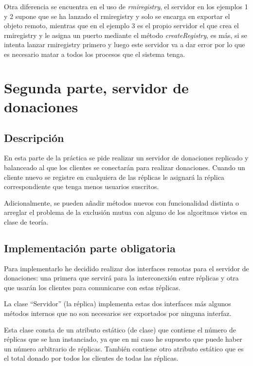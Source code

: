 \documentclass{article}
\begin{document}
Otra diferencia se encuentra en el uso de \textit{rmiregistry}, el servidor en los ejemplos 1 y 2 supone que se ha lanzado el rmiregistry y solo se encarga en exportar el objeto remoto, mientras que en el ejemplo 3 es el propio servidor el que crea el rmiregistry y le asigna un puerto mediante el método \textit{createRegistry}, es más, si se intenta lanzar rmiregistry primero y luego este servidor va a dar error por lo que es necesario matar a todos los procesos que el sistema tenga.


\section{Segunda parte, servidor de donaciones}
\subsection{Descripción}
En esta parte de la práctica se pide realizar un servidor de donaciones replicado y balanceado al que los clientes se conectarán para realizar donaciones. Cuando un cliente nuevo se registre en cualquiera de las réplicas le asignará la réplica correspondiente que tenga menos usuarios suscritos.

Adicionalmente, se pueden añadir métodos nuevos con funcionalidad distinta o arreglar el problema de la exclusión mutua con alguno de los algoritmos vistos en clase de teoría.

\subsection{Implementación parte obligatoria}
Para implementarlo he decidido realizar dos interfaces remotas para el servidor de donaciones: una primera que servirá para la interconexión entre réplicas y otra que usarán los clientes para comunicarse con estas réplicas.


La clase ``Servidor'' (la réplica) implementa estas dos interfaces más algunos métodos internos que no son necesarios ser exportados por ninguna interfaz.

Esta clase consta de un atributo estático (de clase) que contiene el número de réplicas que se han instanciado, ya que en mi caso he supuesto que puede haber un número arbitrario de réplicas. También contiene otro atributo estático que es el total donado por todos los clientes de todas las réplicas.
\end{document}
